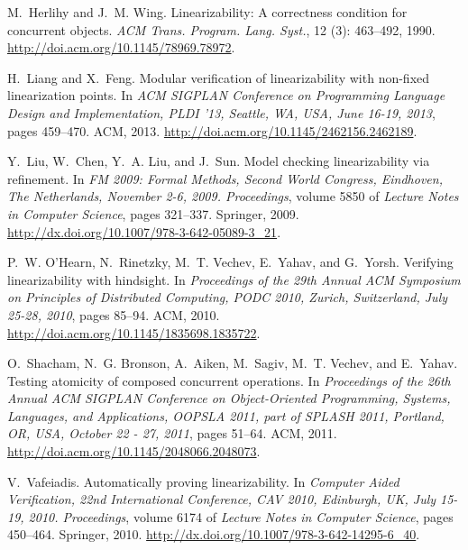 \documentclass[9pt,natbib,authoryear]{sigplanconf}
\begin{document}
\begin{thebibliography}{26}
M.~Herlihy and J.~M. Wing.
\newblock Linearizability: {A} correctness condition for concurrent objects.
\newblock \emph{{ACM} Trans. Program. Lang. Syst.}, 12 (3):
  463--492, 1990.
\newblock \url{http://doi.acm.org/10.1145/78969.78972}.

H.~Liang and X.~Feng.
\newblock Modular verification of linearizability with non-fixed linearization
  points.
\newblock In \emph{{ACM} {SIGPLAN} Conference on Programming Language Design
  and Implementation, {PLDI} '13, Seattle, WA, USA, June 16-19, 2013}, pages
  459--470. {ACM}, 2013.
\newblock \url{http://doi.acm.org/10.1145/2462156.2462189}.

Y.~Liu, W.~Chen, Y.~A. Liu, and J.~Sun.
\newblock Model checking linearizability via refinement.
\newblock In \emph{{FM} 2009: Formal Methods, Second World Congress, Eindhoven,
  The Netherlands, November 2-6, 2009. Proceedings}, volume 5850 of
  \emph{Lecture Notes in Computer Science}, pages 321--337. Springer, 2009.
\newblock \url{http://dx.doi.org/10.1007/978-3-642-05089-3_21}.

P.~W. O'Hearn, N.~Rinetzky, M.~T. Vechev, E.~Yahav, and G.~Yorsh.
\newblock Verifying linearizability with hindsight.
\newblock In \emph{Proceedings of the 29th Annual {ACM} Symposium on Principles
  of Distributed Computing, {PODC} 2010, Zurich, Switzerland, July 25-28,
  2010}, pages 85--94. {ACM}, 2010.
\newblock \url{http://doi.acm.org/10.1145/1835698.1835722}.

O.~Shacham, N.~G. Bronson, A.~Aiken, M.~Sagiv, M.~T. Vechev, and E.~Yahav.
\newblock Testing atomicity of composed concurrent operations.
\newblock In \emph{Proceedings of the 26th Annual {ACM} {SIGPLAN} Conference on
  Object-Oriented Programming, Systems, Languages, and Applications, {OOPSLA}
  2011, part of {SPLASH} 2011, Portland, OR, USA, October 22 - 27, 2011}, pages
  51--64. {ACM}, 2011.
\newblock \url{http://doi.acm.org/10.1145/2048066.2048073}.

V.~Vafeiadis.
\newblock Automatically proving linearizability.
\newblock In \emph{Computer Aided Verification, 22nd International Conference,
  {CAV} 2010, Edinburgh, UK, July 15-19, 2010. Proceedings}, volume 6174 of
  \emph{Lecture Notes in Computer Science}, pages 450--464. Springer, 2010.
\newblock \url{http://dx.doi.org/10.1007/978-3-642-14295-6_40}.


\end{thebibliography}
\end{document}
